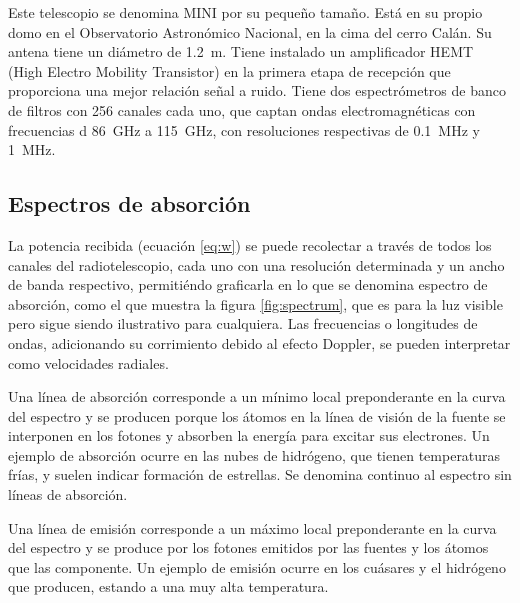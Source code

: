 Este telescopio se denomina MINI por su pequeño tamaño. Está en su propio domo en el Observatorio Astronómico Nacional, en la cima del cerro Calán. Su antena tiene un diámetro de \SI{1.2}{\meter}. Tiene instalado un amplificador HEMT (High Electro Mobility Transistor) en la primera etapa de recepción que proporciona una mejor relación señal a ruido. Tiene dos espectrómetros de banco de filtros con 256 canales cada uno, que captan ondas electromagnéticas con frecuencias d \SI{86}{\giga\hertz} a \SI{115}{\giga\hertz}, con resoluciones respectivas de \SI{0.1}{\mega\hertz} y \SI{1}{\mega\hertz}.

\subsection{Espectros de absorción}

La potencia recibida (ecuación \ref{eq:w}) se puede recolectar a través de todos los canales del radiotelescopio, cada uno con una resolución determinada y un ancho de banda respectivo, permitiéndo graficarla en lo que se denomina espectro de absorción, como el que muestra la figura \ref{fig:spectrum}, que es para la luz visible pero sigue siendo ilustrativo para cualquiera. Las frecuencias o longitudes de ondas, adicionando su corrimiento debido al efecto Doppler, se pueden interpretar como velocidades radiales.

Una línea de absorción corresponde a un mínimo local preponderante en la curva del espectro y se producen porque los átomos en la línea de visión de la fuente se interponen en los fotones y absorben la energía para excitar sus electrones. Un ejemplo de absorción ocurre en las nubes de hidrógeno, que tienen temperaturas frías, y suelen indicar formación de estrellas. Se denomina continuo al espectro sin líneas de absorción.

Una línea de emisión corresponde a un máximo local preponderante en la curva del espectro y se produce por los fotones emitidos por las fuentes y los átomos que las componente. Un ejemplo de emisión ocurre en los cuásares y el hidrógeno que producen, estando a una muy alta temperatura.

